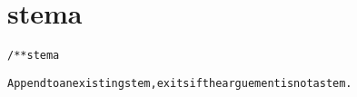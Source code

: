 \section{stema}
\begin{shaded}
\begin{alltt}
/** stema

Append to an existing stem, exits if the arguement is not a stem.

\end{alltt}
\end{shaded}
